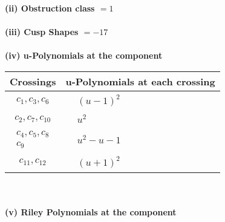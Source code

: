 \documentclass[1p]{elsarticle_modified}
\theoremstyle{definition}
\begin{document}
\flushleft \textbf{(ii) Obstruction class $= 1$}\\~\\
\flushleft \textbf{(iii) Cusp Shapes $= -17$}\\~\\
\newpage\renewcommand{\arraystretch}{1}
\flushleft \textbf{(iv) u-Polynomials at the component}\newline \\
\begin{tabular}{m{50pt}|m{274pt}}
Crossings & \hspace{64pt}u-Polynomials at each crossing \\
\hline $$\begin{aligned}c_{1},c_{3},c_{6}\end{aligned}$$&$\begin{aligned}
&(u-1)^2
\end{aligned}$\\
\hline $$\begin{aligned}c_{2},c_{7},c_{10}\end{aligned}$$&$\begin{aligned}
&u^2
\end{aligned}$\\
\hline $$\begin{aligned}c_{4},c_{5},c_{8}\\c_{9}\end{aligned}$$&$\begin{aligned}
&u^2- u-1
\end{aligned}$\\
\hline $$\begin{aligned}c_{11},c_{12}\end{aligned}$$&$\begin{aligned}
&(u+1)^2
\end{aligned}$\\
\hline
\end{tabular}\\~\\
\newpage\renewcommand{\arraystretch}{1}
\flushleft \textbf{(v) Riley Polynomials at the component}\newline \\
\end{document}
